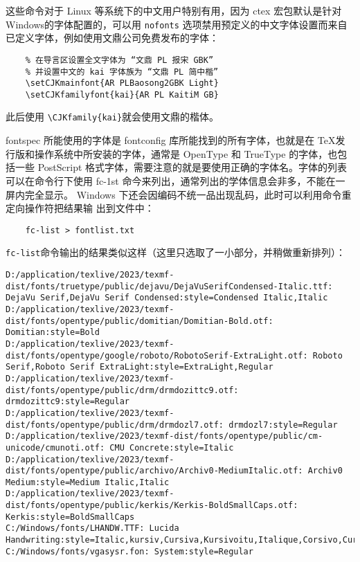 这些命令对于 Linux 等系统下的中文用户特别有用，因为 ctex 宏包默认是针对 Windows的字体配置的，可以用 \verb|nofonts| 选项禁用预定义的中文字体设置而来自已定义字体，例如使用文鼎公司免费发布的字体：
\begin{lstlisting}
    % 在导言区设置全文字体为 “文鼎 PL 报宋 GBK”
    % 并设置中文的 kai 字体族为 “文鼎 PL 简中楷”
    \setCJKmainfont{AR PLBaosong2GBK Light}
    \setCJKfamilyfont{kai}{AR PL KaitiM GB}
\end{lstlisting}

此后使用 \verb|\CJKfamily{kai}|就会使用文鼎的楷体。

fontspec 所能使用的字体是 fontconfig 库所能找到的所有字体，也就是在 \TeX 发行版和操作系统中所安装的字体，通常是 OpenType 和 TrueType 的字体，也包括一些 PostScript 格式字体，需要注意的就是要使用正确的字体名。字体的列表可以在命令行下使用 fc-1st 命今来列出，通常列出的学体信息会非多，不能在一屏内完全显示。 Windows 下还会因编码不统一品出现乱码，此时可以利用命令重定向操作符把结果输
出到文件中：
\begin{lstlisting}
    fc-list > fontlist.txt
\end{lstlisting}

\verb|fc-list|命令输出的结果类似这样（这里只选取了一小部分，并稍做重新排列）：

\begin{lstlisting}
D:/application/texlive/2023/texmf-dist/fonts/truetype/public/dejavu/DejaVuSerifCondensed-Italic.ttf: DejaVu Serif,DejaVu Serif Condensed:style=Condensed Italic,Italic
D:/application/texlive/2023/texmf-dist/fonts/opentype/public/domitian/Domitian-Bold.otf: Domitian:style=Bold
D:/application/texlive/2023/texmf-dist/fonts/opentype/google/roboto/RobotoSerif-ExtraLight.otf: Roboto Serif,Roboto Serif ExtraLight:style=ExtraLight,Regular
D:/application/texlive/2023/texmf-dist/fonts/opentype/public/drm/drmdozittc9.otf: drmdozittc9:style=Regular
D:/application/texlive/2023/texmf-dist/fonts/opentype/public/drm/drmdozl7.otf: drmdozl7:style=Regular
D:/application/texlive/2023/texmf-dist/fonts/opentype/public/cm-unicode/cmunoti.otf: CMU Concrete:style=Italic
D:/application/texlive/2023/texmf-dist/fonts/opentype/public/archivo/Archiv0-MediumItalic.otf: Archiv0 Medium:style=Medium Italic,Italic
D:/application/texlive/2023/texmf-dist/fonts/opentype/public/kerkis/Kerkis-BoldSmallCaps.otf: Kerkis:style=BoldSmallCaps
C:/Windows/fonts/LHANDW.TTF: Lucida Handwriting:style=Italic,kursiv,Cursiva,Kursivoitu,Italique,Corsivo,Cursief,Itálico
C:/Windows/fonts/vgasysr.fon: System:style=Regular
\end{lstlisting}

